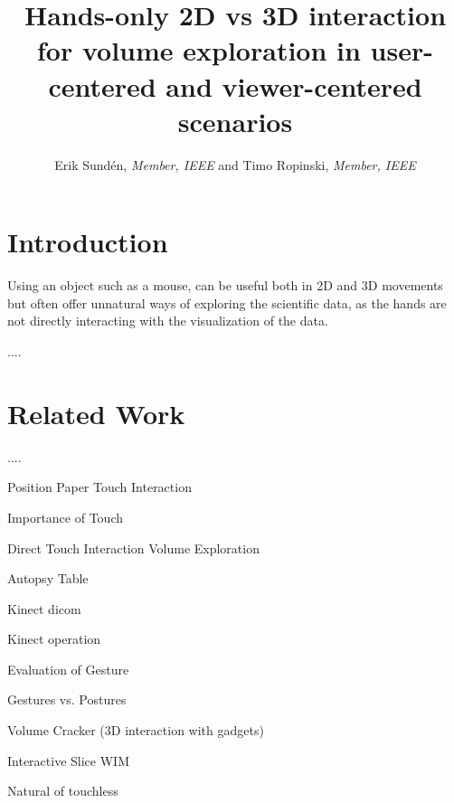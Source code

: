 \documentclass[review,journal]{vgtc}         %
\title{Hands-only 2D vs 3D interaction for volume exploration in user-centered and viewer-centered scenarios}
\author{Erik Sund\'en, \textit{Member, IEEE} and Timo Ropinski, \textit{Member, IEEE}}
\begin{document}

\maketitle

\section{Introduction}\label{sec:introduction}

Using an object such as a mouse, can be useful both in 2D and 3D movements but often offer unnatural ways of exploring the scientific data, as the hands are not directly interacting with the visualization of the data.

....


\section{Related Work}\label{sec:relatedwork}

....

Position Paper Touch Interaction \cite{isenberg:hal-00781512}

Importance of Touch \cite{Robles-De-La-Torre:2006:IST:1158827.1159097}

Direct Touch Interaction Volume Exploration \cite{Klein:2012:DSD:2322389.2322403}

Autopsy Table \cite{LRFPY11}

Kinect dicom \cite{zora82163}

Kinect operation \cite{OHaraGSPVMCCRDC14}

Evaluation of Gesture \cite{Kirmizibayrak:2011:EGB:2087756.2087764}

Gestures vs. Postures \cite{isenberg:hal-00781237}

Volume Cracker (3D interaction with gadgets) \cite{Laha:2013:VCB:2491367.2491368}

Interactive Slice WIM \cite{Coffey:2012:ISW:2360744.2360843}

Natural of touchless \cite{O'hara:2013:NTP:2442106.2442111}
\end{document}
